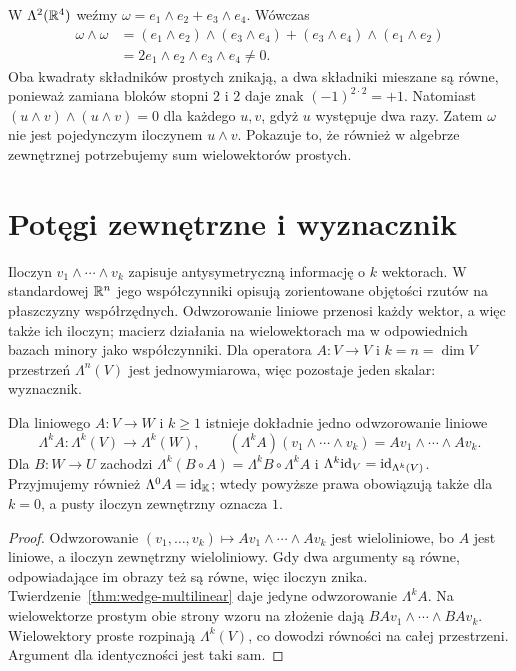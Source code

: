 \begin{przyklad}
W $\Lambda^2(\mathbb{R}^4)$ weźmy
$\omega=e_1\wedge e_2+e_3\wedge e_4$. Wówczas
\[
\begin{aligned}
 \omega\wedge\omega
 &=(e_1\wedge e_2)\wedge(e_3\wedge e_4)
   +(e_3\wedge e_4)\wedge(e_1\wedge e_2)\\
 &=2e_1\wedge e_2\wedge e_3\wedge e_4\ne0.
\end{aligned}
\]
Oba kwadraty składników prostych znikają, a dwa składniki
mieszane są równe, ponieważ zamiana bloków stopni $2$ i $2$
daje znak $(-1)^{2\cdot2}=+1$.
Natomiast $(u\wedge v)\wedge(u\wedge v)=0$ dla każdego
$u,v$, gdyż $u$ występuje dwa razy. Zatem $\omega$ nie
jest pojedynczym iloczynem $u\wedge v$. Pokazuje to, że
również w algebrze zewnętrznej potrzebujemy sum wielowektorów
prostych.
\end{przyklad}

\section{Potęgi zewnętrzne i wyznacznik}
\label{sec:wyznacznik}

Iloczyn $v_1\wedge\cdots\wedge v_k$ zapisuje
antysymetryczną informację o $k$ wektorach. W standardowej $\mathbb{R}^n$
jego współczynniki opisują zorientowane objętości
rzutów na płaszczyzny współrzędnych. Odwzorowanie liniowe
przenosi każdy wektor, a więc także ich iloczyn; macierz
działania na wielowektorach ma w odpowiednich bazach minory
jako współczynniki. Dla operatora
$A\colon V\to V$ i $k=n=\dim V$ przestrzeń $\Lambda^n(V)$
jest jednowymiarowa, więc pozostaje jeden skalar: wyznacznik.

\begin{twierdzenie}
\label{thm:potega-zewn-operatora}
Dla liniowego $A\colon V\to W$ i $k\geq1$ istnieje dokładnie jedno odwzorowanie
liniowe
\[
 \Lambda^k A\colon\Lambda^k(V)\to\Lambda^k(W),\qquad
 (\Lambda^k A)(v_1\wedge\cdots\wedge v_k)
 =Av_1\wedge\cdots\wedge Av_k.
\]
Dla $B\colon W\to U$ zachodzi
$\Lambda^k(B\circ A)=\Lambda^k B\circ\Lambda^k A$
i $\Lambda^k\mathrm{id}_V=\mathrm{id}_{\Lambda^k(V)}$.
Przyjmujemy również $\Lambda^0A=\mathrm{id}_{\mathbb K}$; wtedy powyższe
prawa obowiązują także dla $k=0$, a pusty iloczyn zewnętrzny oznacza $1$.
\end{twierdzenie}
\begin{proof}
Odwzorowanie $(v_1,\ldots,v_k)\mapsto
Av_1\wedge\cdots\wedge Av_k$ jest wieloliniowe,
bo $A$ jest liniowe, a iloczyn zewnętrzny wieloliniowy.
Gdy dwa argumenty są równe, odpowiadające im obrazy też
są równe, więc iloczyn znika. Twierdzenie~\ref{thm:wedge-multilinear}
daje jedyne odwzorowanie $\Lambda^k A$.
Na wielowektorze prostym obie strony wzoru na złożenie
dają $BA v_1\wedge\cdots\wedge BA v_k$.
Wielowektory proste rozpinają $\Lambda^k(V)$, co dowodzi
równości na całej przestrzeni. Argument dla identyczności
jest taki sam.
\end{proof}

